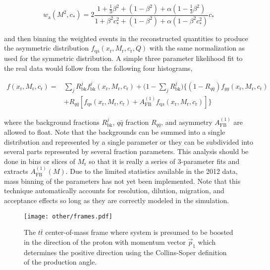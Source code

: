 \begin{equation}
w_\mathrm{a}(M^2, c_*) = 2\frac{1+\frac{1}{3}\beta^2+(1-\beta^2)+\alpha(1-\frac{1}{3}\beta^2)}{1+\beta^2c_*^2+\left(1-\beta^2\right)+\alpha\left(1-\beta^2c_*^2\right)}c_*
\end{equation}

and then binning the weighted events in the reconstructed quantities to produce the asymmetric distribution $f_\mathrm{qa}(x_\mathrm{r}, M_\mathrm{r}, c_\mathrm{r}, Q)$ with the same normalization as used for the symmetric distribution.  A simple three parameter likelihood fit to the real data would follow from the following four histograms,

\begin{align}
f(x_\mathrm{r},M_\mathrm{r},c_\mathrm{r}) =& \sum_jR^j_\mathrm{bk}f^j_\mathrm{bk}(x_\mathrm{r},M_\mathrm{r},c_\mathrm{r})+\biggl(1-\sum_jR^j_\mathrm{bk}\biggr )\biggl\lbrace \left(1-R_{q\bar q}\right) f_{gg}(x_\mathrm{r},M_\mathrm{r},c_\mathrm{r})\nonumber \\ &+R_{q\bar q}\left[f_\mathrm{qs}(x_\mathrm{r}, M_\mathrm{r}, c_\mathrm{r})+A_\mathrm{FB}^{(1)}f_\mathrm{qa}(x_\mathrm{r}, M_\mathrm{r}, c_\mathrm{r})\right]\biggr\rbrace
\label{eq:template_schemeone}
\end{align}

where the background fractions $R^j_\mathrm{bk}$, $q\bar q$ fraction $R_{q\bar q}$, and asymmetry $A_\mathrm{FB}^{(1)}$ are allowed to float.  Note that the backgrounds can be summed into a single distribution and represented by a single parameter or they can be subdivided into several parts represented by several fraction parameters.  This analysis should be done in bins or slices of $M_\mathrm{r}$ so that it is really a series of 3-parameter fits and extracts $A_\mathrm{FB}^{(1)}(M)$.  Due  to the limited statistics available in the 2012 data, mass binning of the parameters has not yet been implemented.  Note that this technique automatically accounts for resolution, dilution, migration, and acceptance effects so long as they are correctly modeled in the simulation.

\begin{figure}[hbt]
  \begin{center}
    \texttt{[image: other/frames.pdf]}
  \caption{\small The $t\bar t$ center-of-mass frame where system is presumed to be boosted in the direction of the proton with momentum vector $\vec p_1$ which determines the positive direction using the Collins-Soper definition of the production angle.}
    \label{fig:frames}
  \end{center}
\end{figure}

